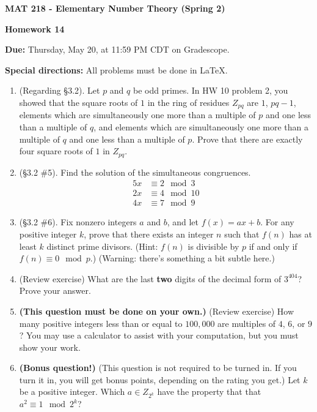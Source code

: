 \documentclass[11pt,a4paper]{article}
\begin{document}
\begin{Large}
\centerline{\bf MAT 218 - Elementary Number Theory (Spring 2)}\medskip
\centerline{\bf Homework 14}\medskip
\end{Large}
{\bf Due:} Thursday, May 20, at 11:59 PM CDT on Gradescope. 

{\bf Special directions:}  All problems must be done in \LaTeX. 


\hrulefill

\begin{enumerate}
	
	
	
	\item (Regarding \S 3.2). Let \(p\) and \(q\) be odd primes. In HW 10 problem 2, you showed that the square roots of \(1\) in the ring of residues \(Z_{pq}\) are \(1\), \(pq-1\), elements which are simultaneously one more than a multiple of \(p\) and one less than a multiple of \(q\), and elements which are simultaneously one more than a multiple of \(q\) and one less than a multiple of \(p\). Prove that there are exactly four square roots of \(1\) in \(Z_{pq}\). 

	\item (\S 3.2 \#5). Find the solution of the simultaneous congruences.
		\begin{align*}
			5x &\equiv 2 \mod 3 \\
			2x &\equiv 4 \mod 10 \\
			4x &\equiv 7 \mod 9 
		\end{align*}
	
	\item (\S 3.2 \#6). Fix nonzero integers \(a\) and \(b\), and let \(f(x) = ax+b\). For any positive integer \(k\), prove that there exists an integer \(n\) such that \(f(n)\) has at least \(k\) distinct prime divisors. (Hint: \(f(n)\) is divisible by \(p\) if and only if \(f(n) \equiv 0 \mod p\).) (Warning: there's something a bit subtle here.)
	
	\item (Review exercise) What are the last \textbf{two} digits of the decimal form of \(3^{404}\)? Prove your answer.
	
	\item \textbf{(This question must be done on your own.)} (Review exercise) How many positive integers less than or equal to \(100{,}000\) are multiples of \(4\), \(6\), or \(9\)? You may use a calculator to assist with your computation, but you must show your work.
	
	\item \textbf{(Bonus question!)} (This question is not required to be turned in. If you turn it in, you will get bonus points, depending on the rating you get.)  Let \(k\) be a positive integer.  Which \(a \in Z_{2^{k}}\) have the property that that \(a^{2} \equiv 1 \mod 2^{k}\)?

\end{enumerate}
\end{document}
